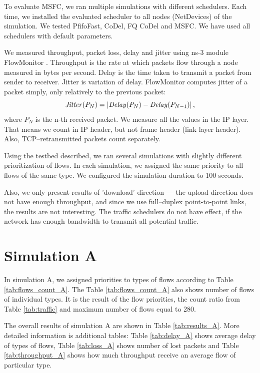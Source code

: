 To evaluate MSFC, we ran multiple simulations with different schedulers. Each time, we installed the evaluated scheduler to all nodes (NetDevices) of the simulation. We tested PfifoFast, CoDel, FQ CoDel and MSFC. We have used all schedulers with default parameters.

We measured throughput, packet loss, delay and jitter using ns-3 module FlowMonitor \cite{flowMonitor}. Throughput is the rate at which packets flow through a node measured in bytes per second. Delay is the time taken to transmit a packet from sender to receiver. Jitter is variation of delay. FlowMonitor computes jitter of a packet simply, only relatively to the previous packet:
\[
	\text{\emph{Jitter}}(P_N) = \left|{\text{\emph{Delay}}(P_N) - \text{\emph{Delay}}(P_{N-1})}\right|,
\]
where $P_N$ is the n-th received packet. We measure all the values in the IP layer. That means we count in IP header, but not frame header (link layer header). Also, TCP--retransmitted packets count separately.

Using the testbed described, we ran several simulations with slightly different prioritization of flows. In each simulation, we assigned the same priority to all flows of the same type. We configured the simulation duration to 100 seconds.

Also, we only present results of 'download' direction --- the upload direction does not have enough throughput, and since we use full--duplex point-to-point links, the results are not interesting. The traffic schedulers do not have effect, if the network has enough bandwidth to transmit all potential traffic. 






\section{Simulation A}
 
%






In simulation A, we assigned priorities to types of flows according to Table \ref{tab:flows_count_A}. The Table \ref{tab:flows_count_A} also shows number of flows of individual types. It is the result of the flow priorities, the count ratio from Table \ref{tab:traffic} and maximum number of flows equal to 280.  

The overall results of simulation A are shown in Table \ref{tab:results_A}. More detailed information is additional tables: Table \ref{tab:delay_A} shows average delay of types of flows, Table \ref{tab:loss_A} shows number of lost packets and Table \ref{tab:throughput_A} shows how much throughput receive an average flow of particular type.

